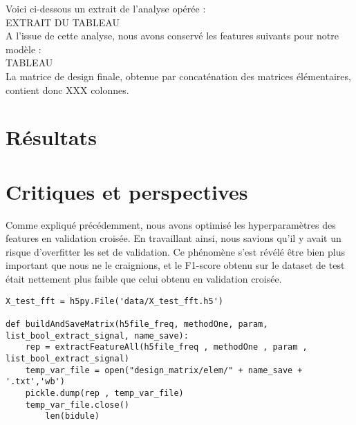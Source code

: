\documentclass{article}
\begin{document}
Voici ci-dessous un extrait de l'analyse opérée :\\

EXTRAIT DU TABLEAU
\\

A l'issue de cette analyse, nous avons conservé les features suivants pour notre modèle :\\

TABLEAU
\\

La matrice de design finale, obtenue par concaténation des matrices élémentaires, contient donc XXX colonnes.\\



\section{Résultats}

\section{ Critiques et perspectives}

Comme expliqué précédemment, nous avons optimisé les hyperparamètres des features en validation croisée. En travaillant ainsi, nous savions qu'il y avait un risque d'overfitter les set de validation. Ce phénomène s'est révélé être bien plus important que nous ne le craignions, et le F1-score obtenu sur le dataset de test était nettement plus faible que celui obtenu en validation croisée.



\begin{lstlisting}
X_test_fft = h5py.File('data/X_test_fft.h5')

def buildAndSaveMatrix(h5file_freq, methodOne, param, list_bool_extract_signal, name_save):
    rep = extractFeatureAll(h5file_freq , methodOne , param , list_bool_extract_signal)
    temp_var_file = open("design_matrix/elem/" + name_save + '.txt','wb')
    pickle.dump(rep , temp_var_file)
    temp_var_file.close()
		len(bidule)
\end{lstlisting}
\end{document}
